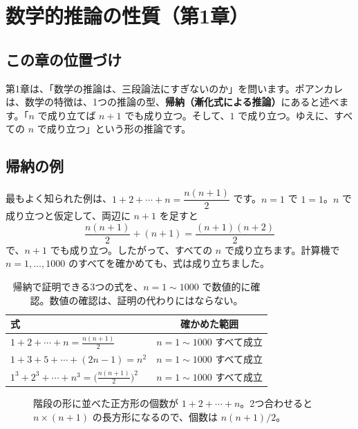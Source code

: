 \documentclass[a4paper,11pt,openany]{ltjsbook}
\begin{document}
\chapter{数学的推論の性質（第1章）}

\section{この章の位置づけ}

第1章は、「数学の推論は、三段論法にすぎないのか」を問います。ポアンカレは、数学の特徴は、1つの推論の型、\textbf{帰納（漸化式による推論）}にあると述べます。「$n$ で成り立てば $n+1$ でも成り立つ。そして、$1$ で成り立つ。ゆえに、すべての $n$ で成り立つ」という形の推論です。

\section{帰納の例}

最もよく知られた例は、$1+2+\cdots+n=\dfrac{n(n+1)}2$ です。$n=1$ で $1=1$。$n$ で成り立つと仮定して、両辺に $n+1$ を足すと
\[
\frac{n(n+1)}2+(n+1)=\frac{(n+1)(n+2)}2
\]
で、$n+1$ でも成り立つ。したがって、すべての $n$ で成り立ちます。計算機で $n=1,\ldots,1000$ のすべてを確かめても、式は成り立ちました。

\begin{table}[htbp]
\centering
\begin{tabular}{lc}
\toprule
式 & 確かめた範囲\\
\midrule
$1+2+\cdots+n=\tfrac{n(n+1)}2$ & $n=1\sim1000$ すべて成立\\
$1+3+5+\cdots+(2n-1)=n^2$ & $n=1\sim1000$ すべて成立\\
$1^3+2^3+\cdots+n^3=\bigl(\tfrac{n(n+1)}2\bigr)^2$ & $n=1\sim1000$ すべて成立\\
\bottomrule
\end{tabular}
\caption{帰納で証明できる3つの式を、$n=1\sim1000$ で数値的に確認。数値の確認は、証明の代わりにはならない。}
\end{table}

\begin{figure}[htbp]
\centering
{}
\caption{階段の形に並べた正方形の個数が $1+2+\cdots+n$。2つ合わせると $n\times(n+1)$ の長方形になるので、個数は $n(n+1)/2$。}
\end{figure}
\end{document}
